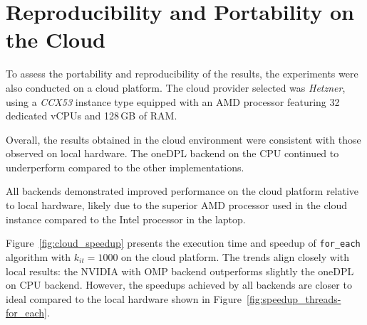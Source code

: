 \documentclass[sigconf]{acmart}
\begin{document}
\section{Reproducibility and Portability on the Cloud}

To assess the portability and reproducibility of the results, the experiments
were also conducted on a cloud platform. The cloud provider selected was
\textit{Hetzner}, using a \textit{CCX53} instance type equipped with an AMD
processor featuring 32 dedicated vCPUs and 128\,GB of RAM.

Overall, the results obtained in the cloud environment were consistent with
those observed on local hardware. The oneDPL backend on the CPU continued to
underperform compared to the other implementations.

All backends demonstrated improved performance on the cloud platform relative
to local hardware, likely due to the superior AMD processor used in the cloud
instance compared to the Intel processor in the laptop.

Figure~\ref{fig:cloud_speedup} presents the execution time and speedup of
\texttt{for\_each} algorithm with $k_{it} = 1000$ on the cloud platform. The
trends align closely with local results: the NVIDIA with OMP backend
outperforms slightly the oneDPL on CPU backend. However, the speedups achieved
by all backends are closer to ideal compared to the local hardware shown in
Figure~\ref{fig:speedup_threads-for_each}.
\end{document}
